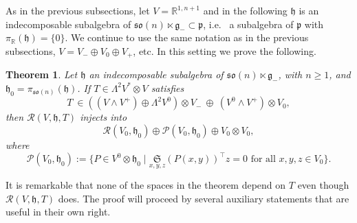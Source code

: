 \documentclass[11pt,a4paper]{amsart}
\newcommand{\p}{\mathfrak{p}}
\newcommand{\g}{\mathfrak{g}}
\newcommand{\h}{\mathfrak{h}}
\newcommand{\+}{\oplus}
\newcommand{\so}{\mathfrak{so}}
\newcommand{\1}{\mathbf{1}}
\newcommand{\R}{\mathbb{R}} %
\newcommand{\<}{\langle}
\renewcommand{\>}{\rangle}
\theoremstyle{definition}
\theoremstyle{plain}
\newtheorem{theorem}[definition]{Theorem}
\numberwithin{equation}{section}
\begin{document}
As in the previous subsections, let 
$V=\R^{1,n+1}$
and in the following $\h$ is
an indecomposable subalgebra  of $\so(n)\ltimes \g_-\subset \p$, i.e.~ a subalgebra of $\p$ with $\pi_\R(\h)=\{0\}$. We continue to use the same notation as in the previous subsections, $V=V_-\+V_0\+V_+$, etc. In this setting we prove the following.
\begin{theorem}\label{curvtheo}
Let  $\h$ an indecomposable subalgebra of $\so(n)\ltimes \g_-$, with $n\ge 1$, and $\h_0=\pi_{\so(n)}(\h)$. If $T\in \Lambda^2 V^*\otimes V$ 
satisfies
\begin{equation}
\label{Tcond}
T\ \in \left( ( V\wedge V^+) \+ \Lambda^2 V^0\right) \otimes V_-\  \+\ (V^0\wedge V^+) \otimes V_0,\end{equation}
then  $\mathcal R(V,\h,T)$ injects into 
\[
\mathcal R(V_0,\h_0)\+
\mathcal P(V_0,\h_0) \+ 
V_0\otimes V_0,\]
where \[ \mathcal P(V_0, \h_0):=\{P\in V^0\otimes \h_0\mid  \underset{x,y,z}{\mathfrak{S}}     \left(P(x,y)\right)^\top z=0\text{ for all }x,y,z\in V_0
\}.\] 
\end{theorem}
It is remarkable that none of the spaces in the theorem depend on $T$ even though $\mathcal R(V,\h,T)$ does. The proof will proceed by several auxiliary statements that are useful in their own right.
\end{document}
